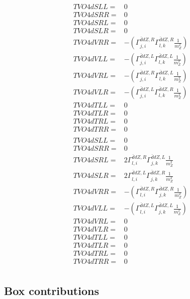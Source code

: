 \documentclass[A4,landscape]{article}
\begin{document}
\begin{align} 
  TVO4dSLL= & 0 \\ 
  TVO4dSRR= & 0 \\ 
  TVO4dSRL= & 0 \\ 
  TVO4dSLR= & 0 \\ 
  TVO4dVRR= & -(\Gamma^{\bar{d}d Z ,R}_{j, i} \Gamma^{\bar{d}d Z ,R}_{l, k} \frac{1}{m^2_{Z}}) \\ 
  TVO4dVLL= & -(\Gamma^{\bar{d}d Z ,L}_{j, i} \Gamma^{\bar{d}d Z ,L}_{l, k} \frac{1}{m^2_{Z}}) \\ 
  TVO4dVRL= & -(\Gamma^{\bar{d}d Z ,R}_{j, i} \Gamma^{\bar{d}d Z ,L}_{l, k} \frac{1}{m^2_{Z}}) \\ 
  TVO4dVLR= & -(\Gamma^{\bar{d}d Z ,L}_{j, i} \Gamma^{\bar{d}d Z ,R}_{l, k} \frac{1}{m^2_{Z}}) \\ 
  TVO4dTLL= & 0 \\ 
  TVO4dTLR= & 0 \\ 
  TVO4dTRL= & 0 \\ 
  TVO4dTRR= & 0 \\ 
\end{align} 
\begin{align} 
  TVO4dSLL= & 0 \\ 
  TVO4dSRR= & 0 \\ 
  TVO4dSRL= & 2 \Gamma^{\bar{d}d Z ,R}_{l, i} \Gamma^{\bar{d}d Z ,L}_{j, k} \frac{1}{m^2_{Z}} \\ 
  TVO4dSLR= & 2 \Gamma^{\bar{d}d Z ,L}_{l, i} \Gamma^{\bar{d}d Z ,R}_{j, k} \frac{1}{m^2_{Z}} \\ 
  TVO4dVRR= & -(\Gamma^{\bar{d}d Z ,R}_{l, i} \Gamma^{\bar{d}d Z ,R}_{j, k} \frac{1}{m^2_{Z}}) \\ 
  TVO4dVLL= & -(\Gamma^{\bar{d}d Z ,L}_{l, i} \Gamma^{\bar{d}d Z ,L}_{j, k} \frac{1}{m^2_{Z}}) \\ 
  TVO4dVRL= & 0 \\ 
  TVO4dVLR= & 0 \\ 
  TVO4dTLL= & 0 \\ 
  TVO4dTLR= & 0 \\ 
  TVO4dTRL= & 0 \\ 
  TVO4dTRR= & 0 \\ 
\end{align} 
\subsection{Box contributions} 
\end{document}
